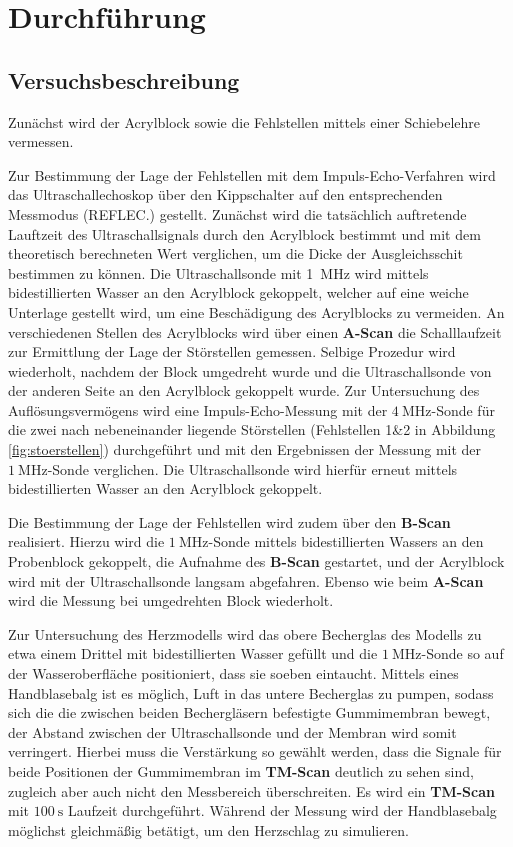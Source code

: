 \section{Durchführung}
\label{sec:Durchführung}



\subsection{Versuchsbeschreibung}
\label{sec:Versuchsbeschreibung}
Zunächst wird der Acrylblock sowie die Fehlstellen mittels einer Schiebelehre vermessen.

Zur Bestimmung der Lage der Fehlstellen mit dem Impuls-Echo-Verfahren wird das Ultraschallechoskop über den Kippschalter auf den entsprechenden Messmodus (REFLEC.) gestellt.
Zunächst wird die tatsächlich auftretende Lauftzeit des Ultraschallsignals durch den Acrylblock bestimmt und mit dem theoretisch berechneten Wert verglichen, um die Dicke der Ausgleichsschit bestimmen zu können.
Die Ultraschallsonde mit \SI{1}{\mega\Hz} wird mittels bidestillierten Wasser an den Acrylblock gekoppelt, welcher auf eine weiche Unterlage gestellt wird, um eine Beschädigung des Acrylblocks zu vermeiden.
An verschiedenen Stellen des Acrylblocks wird über einen \textbf{A-Scan} die Schalllaufzeit zur Ermittlung der Lage der Störstellen gemessen. Selbige Prozedur wird wiederholt, nachdem der Block umgedreht wurde und die Ultraschallsonde von der anderen Seite an den Acrylblock gekoppelt wurde.
Zur Untersuchung des Auflösungsvermögens wird eine Impuls-Echo-Messung mit der $\SI{4}{\mega\Hz}$-Sonde für die zwei nach nebeneinander liegende Störstellen (Fehlstellen 1\&2 in Abbildung \ref{fig:stoerstellen}) durchgeführt und mit den Ergebnissen der Messung mit der $\SI{1}{\mega\Hz}$-Sonde verglichen.
Die Ultraschallsonde wird hierfür erneut mittels bidestillierten Wasser an den Acrylblock gekoppelt.

Die Bestimmung der Lage der Fehlstellen wird zudem über den \textbf{B-Scan} realisiert. Hierzu wird die $\SI{1}{\mega\Hz}$-Sonde mittels bidestillierten Wassers an den Probenblock gekoppelt, die Aufnahme des \textbf{B-Scan} gestartet, und der Acrylblock wird mit der Ultraschallsonde langsam abgefahren.
Ebenso wie beim \textbf{A-Scan} wird die Messung bei umgedrehten Block wiederholt.

Zur Untersuchung des Herzmodells wird das obere Becherglas des Modells zu etwa einem Drittel mit bidestillierten Wasser gefüllt und die $\SI{1}{\mega\Hz}$-Sonde so auf der Wasseroberfläche positioniert, dass sie soeben eintaucht. Mittels eines Handblasebalg ist es möglich, Luft in das untere Becherglas zu pumpen, sodass sich die die zwischen beiden Bechergläsern befestigte Gummimembran bewegt, der Abstand zwischen der Ultraschallsonde und der Membran wird somit verringert. Hierbei muss die Verstärkung so gewählt werden, dass die Signale  für beide Positionen der Gummimembran im \textbf{TM-Scan} deutlich zu sehen sind, zugleich aber auch nicht den Messbereich überschreiten.
Es wird ein \textbf{TM-Scan} mit $\SI{100}{\second}$ Laufzeit durchgeführt. Während der Messung wird der Handblasebalg möglichst gleichmäßig betätigt, um den Herzschlag zu simulieren.

